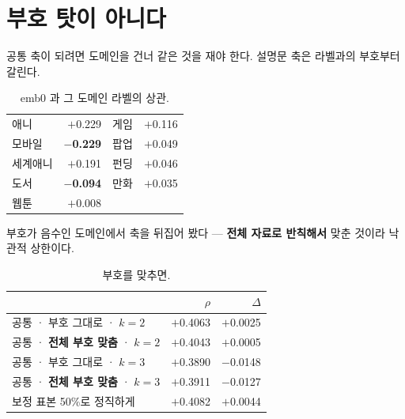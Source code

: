\documentclass[10pt]{article}
\begin{document}

\section{부호 탓이 아니다}

공통 축이 되려면 도메인을 건너 같은 것을 재야 한다. 설명문 축은 라벨과의
부호부터 갈린다.

\begin{table}[t]
\centering\tsize
\caption{emb0 과 그 도메인 라벨의 상관.}
\begin{tabular}{lrlr}
\toprule
애니 & $+$0.229 & 게임 & $+$0.116 \\
모바일 & \textbf{$-$0.229} & 팝업 & $+$0.049 \\
세계애니 & $+$0.191 & 펀딩 & $+$0.046 \\
도서 & \textbf{$-$0.094} & 만화 & $+$0.035 \\
웹툰 & $+$0.008 & & \\
\bottomrule
\end{tabular}
\end{table}

부호가 음수인 도메인에서 축을 뒤집어 봤다 --- \textbf{전체 자료로 반칙해서}
맞춘 것이라 낙관적 상한이다.

\begin{table}[t]
\centering\tsize
\caption{부호를 맞추면.}
\begin{tabular}{lrr}
\toprule
& $\rho$ & $\Delta$ \\
\midrule
공통 · 부호 그대로 · $k{=}2$ & $+$0.4063 & $+$0.0025 \\
공통 · \textbf{전체 부호 맞춤} · $k{=}2$ & $+$0.4043 & $+$0.0005 \\
공통 · 부호 그대로 · $k{=}3$ & $+$0.3890 & $-$0.0148 \\
공통 · \textbf{전체 부호 맞춤} · $k{=}3$ & $+$0.3911 & $-$0.0127 \\
\midrule
보정 표본 50\%로 정직하게 & $+$0.4082 & $+$0.0044 \\
\bottomrule
\end{tabular}
\end{table}

\end{document}
